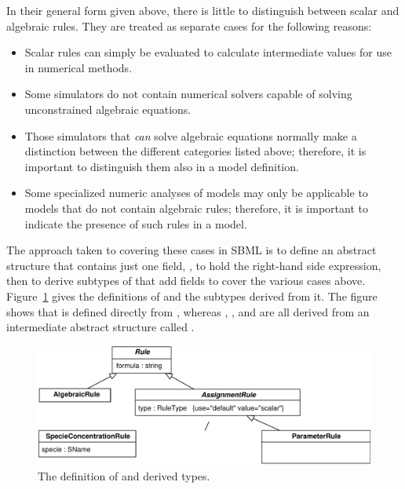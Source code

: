\documentclass[10pt]{cekarticle}
\newcommand{\vref}[1]{\ref{#1}}
\newenvironment{blockChanged}{\color{BrickRed}}{}
\begin{document}
\begin{blockChanged}
In their general form given above, there is little to distinguish between
scalar and algebraic rules.  They are treated as separate cases for the
following reasons:
\begin{itemize}
  
\item Scalar rules can simply be evaluated to calculate intermediate
  values for use in numerical methods.
  
\item Some simulators do not contain numerical solvers capable of solving
  unconstrained algebraic equations.
  
\item Those simulators that \emph{can} solve algebraic equations normally
  make a distinction between the different categories listed above;
  therefore, it is important to distinguish them also in a model
  definition.
  
\item Some specialized numeric analyses of models may only be applicable to
  models that do not contain algebraic rules; therefore, it is important to
  indicate the presence of such rules in a model.
\end{itemize}
\end{blockChanged}

The approach taken to covering these cases in SBML is to define an abstract
 structure that contains just one field, , to
hold the right-hand side expression, then to derive subtypes of
 that add fields to cover the various cases above.
Figure~\vref{fig:rules} gives the definitions of  and the
subtypes derived from it.  The figure shows that  is
defined directly from , whereas ,
, and  are all derived
from an intermediate abstract structure called .

\begin{figure}[htb]
  \centering
  \includegraphics[scale = 0.68]{rule}
  \caption{The definition of  and derived types.}
  \label{fig:rules}
\end{figure}
\end{document}

